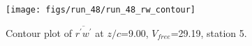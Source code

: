 \begin{figure}[H]
\centering
\texttt{[image: figs/run\_48/run\_48\_rw\_contour]}
\caption{Contour plot of $\overline{r^\prime w^\prime}$ at $z/c$=9.00, $V_{free}$=29.19, station 5.}
\end{figure}


